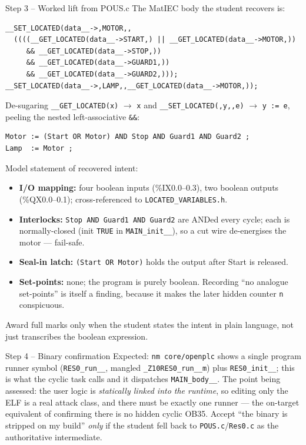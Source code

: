 \documentclass[11pt,a4paper]{article}
\begin{document}
\begin{solutionbox}{Step 3 -- Worked lift from POUS.c}
The MatIEC body the student recovers is:
\begin{lstlisting}
__SET_LOCATED(data__->,MOTOR,,
  ((((__GET_LOCATED(data__->START,) || __GET_LOCATED(data__->MOTOR,))
     && __GET_LOCATED(data__->STOP,))
     && __GET_LOCATED(data__->GUARD1,))
     && __GET_LOCATED(data__->GUARD2,)));
__SET_LOCATED(data__->,LAMP,,__GET_LOCATED(data__->MOTOR,));
\end{lstlisting}
De-sugaring \texttt{\_\_GET\_LOCATED(x)} $\to$ \texttt{x} and
\texttt{\_\_SET\_LOCATED(,y,,e)} $\to$ \texttt{y := e}, peeling the nested
left-associative \texttt{\&\&}:
\begin{lstlisting}
Motor := (Start OR Motor) AND Stop AND Guard1 AND Guard2 ;
Lamp  := Motor ;
\end{lstlisting}
Model statement of recovered intent:
\begin{itemize}\setlength{\itemsep}{1pt}
  \item \textbf{I/O mapping:} four boolean inputs (\%IX0.0--0.3), two
        boolean outputs (\%QX0.0--0.1); cross-referenced to
        \texttt{LOCATED\_VARIABLES.h}.
  \item \textbf{Interlocks:} \texttt{Stop AND Guard1 AND Guard2} are ANDed
        every cycle; each is normally-closed (init \texttt{TRUE} in
        \texttt{MAIN\_init\_\_}), so a cut wire de-energises the motor ---
        fail-safe.
  \item \textbf{Seal-in latch:} \texttt{(Start OR Motor)} holds the output
        after Start is released.
  \item \textbf{Set-points:} none; the program is purely boolean. Recording
        ``no analogue set-points'' is itself a finding, because it makes the
        later hidden counter \texttt{n} conspicuous.
\end{itemize}
Award full marks only when the student states the intent in plain language,
not just transcribes the boolean expression.
\end{solutionbox}

\begin{solutionbox}{Step 4 -- Binary confirmation}
Expected: \texttt{nm core/openplc} shows a single program runner symbol
(\texttt{RES0\_run\_\_}, mangled \texttt{\_Z10RES0\_run\_\_m}) plus
\texttt{RES0\_init\_\_}; this is what the cyclic task calls and it
dispatches \texttt{MAIN\_body\_\_}. The point being assessed: the user logic
is \emph{statically linked into the runtime}, so editing only the ELF is a
real attack class, and there must be exactly one runner --- the on-target
equivalent of confirming there is no hidden cyclic OB35. Accept ``the
binary is stripped on my build'' \emph{only} if the student fell back to
\texttt{POUS.c}/\texttt{Res0.c} as the authoritative intermediate.
\end{solutionbox}
\end{document}
